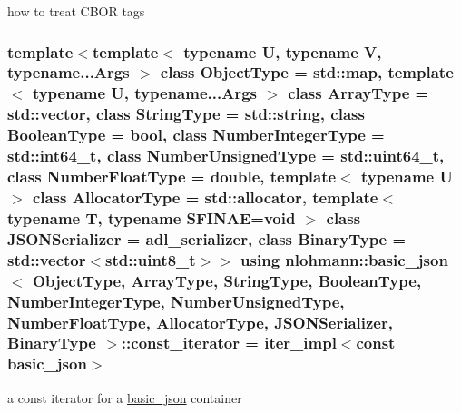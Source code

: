 how to treat C\+B\+OR tags 

\subsubsection[{\texorpdfstring{const\+\_\+iterator}{const_iterator}}]{\setlength{\rightskip}{0pt plus 5cm}template$<$template$<$ typename U, typename V, typename...\+Args $>$ class Object\+Type = std\+::map, template$<$ typename U, typename...\+Args $>$ class Array\+Type = std\+::vector, class String\+Type  = std\+::string, class Boolean\+Type  = bool, class Number\+Integer\+Type  = std\+::int64\+\_\+t, class Number\+Unsigned\+Type  = std\+::uint64\+\_\+t, class Number\+Float\+Type  = double, template$<$ typename U $>$ class Allocator\+Type = std\+::allocator, template$<$ typename T, typename S\+F\+I\+N\+A\+E=void $>$ class J\+S\+O\+N\+Serializer = adl\+\_\+serializer, class Binary\+Type  = std\+::vector$<$std\+::uint8\+\_\+t$>$$>$ using {\bf nlohmann\+::basic\+\_\+json}$<$ Object\+Type, Array\+Type, String\+Type, Boolean\+Type, Number\+Integer\+Type, Number\+Unsigned\+Type, Number\+Float\+Type, Allocator\+Type, J\+S\+O\+N\+Serializer, Binary\+Type $>$\+::{\bf const\+\_\+iterator} =  {\bf iter\+\_\+impl}$<$const {\bf basic\+\_\+json}$>$}\hypertarget{classnlohmann_1_1basic__json_aebd2cfa7e4ded4e97cde9269bfeeea38}{}\label{classnlohmann_1_1basic__json_aebd2cfa7e4ded4e97cde9269bfeeea38}


a const iterator for a \hyperlink{classnlohmann_1_1basic__json}{basic\+\_\+json} container 

